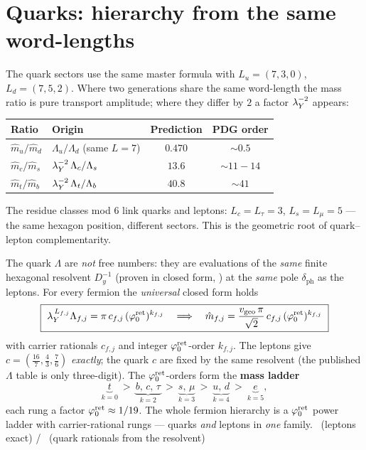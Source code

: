 \section{Quarks: hierarchy from the same word-lengths}
The quark sectors use the same master formula with $L_u=(7,3,0)$, $L_d=(7,5,2)$. Where two generations
share the same word-length the mass ratio is pure transport amplitude; where they differ by $2$ a factor
$\lambda_Y^{-2}$ appears:

\begin{center}\small
\renewcommand{\arraystretch}{1.2}
\begin{tabularx}{\linewidth}{@{}p{3.2cm}p{5.5cm}cc@{}}
\toprule
\textbf{Ratio} & \textbf{Origin} & \textbf{Prediction} & \textbf{PDG order} \\
\midrule
$\hat m_u/\hat m_d$ & $\Lambda_u/\Lambda_d$ (same $L{=}7$) & $0.470$ & $\sim0.5$ \\
$\hat m_c/\hat m_s$ & $\lambda_Y^{-2}\,\Lambda_c/\Lambda_s$ & $13.6$ & $\sim11{-}14$ \\
$\hat m_t/\hat m_b$ & $\lambda_Y^{-2}\,\Lambda_t/\Lambda_b$ & $40.8$ & $\sim41$ \\
\bottomrule
\end{tabularx}
\end{center}

\noindent The residue classes mod $6$ link quarks and leptons: $L_c=L_\tau=3$, $L_s=L_\mu=5$ --- the same
hexagon position, different sectors. This is the geometric root of quark--lepton complementarity.

\begin{winbox}
The quark $\Lambda$ are \emph{not} free numbers: they are evaluations of the \emph{same} finite hexagonal
resolvent $D_y^{-1}$ (proven in closed form, ) at the \emph{same} pole
$\delta_{\mathrm{ph}}$ as the leptons. For every fermion the
\emph{universal} closed form holds
\[
  \boxed{\ \lambda_Y^{\,L_{f,j}}\Lambda_{f,j}=\pi\,c_{f,j}\,(\phiz)^{k_{f,j}}\quad\Longrightarrow\quad
  \hat m_{f,j}=\frac{\vgeo\,\pi}{\sqrt2}\,c_{f,j}\,(\phiz)^{k_{f,j}}\ }
\]
with carrier rationals $c_{f,j}$ and integer $\varphi_0^{\mathrm{ret}}$-order $k_{f,j}$. The leptons give
$c=(\tfrac{16}{7},\tfrac43,\tfrac76)$ \emph{exactly}; the quark $c$ are fixed by the same resolvent (the
published $\Lambda$ table is only three-digit). The $\varphi_0^{\mathrm{ret}}$-orders form the \textbf{mass ladder}
\[
  \underbrace{t}_{k=0}\ >\ \underbrace{b,\,c,\,\tau}_{k=2}\ >\ \underbrace{s,\,\mu}_{k=3}\ >\
  \underbrace{u,\,d}_{k=4}\ >\ \underbrace{e}_{k=5},
\]
each rung a factor $\varphi_0^{\mathrm{ret}}\approx1/19$. The whole fermion hierarchy is a $\varphi_0^{\mathrm{ret}}$ power ladder with
carrier-rational rungs --- quarks \emph{and} leptons in \emph{one} family. \mE\ (leptons exact) / \mC\
(quark rationals from the resolvent)
\end{winbox}

